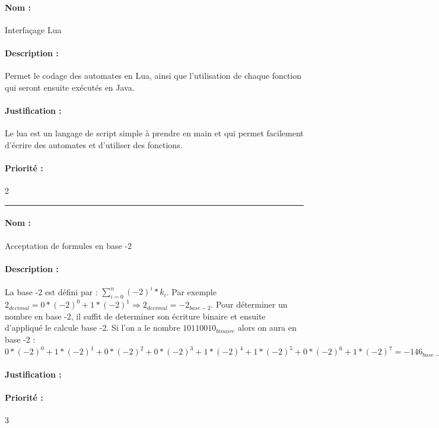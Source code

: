 \documentclass{article}%
\begin{document}
\paragraph{Nom :} Interfaçage Lua

\paragraph{Description :} Permet le codage des automates en Lua, ainsi que l'utilisation de chaque fonction qui seront ensuite exécutés en Java.

\paragraph{Justification :} Le lua est un langage de script simple à prendre en main et qui permet facilement d'écrire des automates et d'utiliser des fonctions.

\paragraph{Priorité :} 2\\

\rule{\linewidth}{1pt}

\paragraph{Nom :} Acceptation de formules en base -2

\paragraph{Description :} La base -2 est défini par : $ \sum\limits_{i=0}^n (-2)^i * k_i$. Par exemple $2_{decimal} = 0 * (-2)^0 + 1 * (-2)^1 \Rightarrow 2_{decimal} = -2_{base - 2}$. Pour déterminer un nombre en base -2, il suffit de determiner son écriture binaire et ensuite d'appliqué le calcule base -2. Si l'on a le nombre $10110010_{binaire}$ alors on aura en base -2 : $0 * (-2)^0 + 1 * (-2)^1 + 0 * (-2)^2 + 0 * (-2)^3 + 1 * (-2)^4 + 1 * (-2)^5 + 0 * (-2)^6 + 1 * (-2)^7 = -146_{base - 2}$

\paragraph{Justification :}

\paragraph{Priorité :} 3\\
\end{document}
